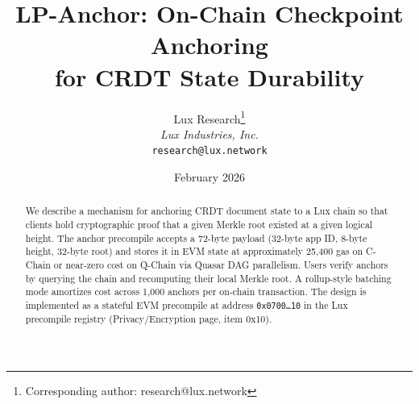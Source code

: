 \documentclass[11pt,a4paper]{article}
\title{LP-Anchor: On-Chain Checkpoint Anchoring\\for CRDT State Durability}
\author{
Lux Research\thanks{Corresponding author: research@lux.network}\\
\textit{Lux Industries, Inc.}\\
\texttt{research@lux.network}
}
\date{February 2026}
\begin{document}
\luxcoverpage

\begin{abstract}
We describe a mechanism for anchoring CRDT document state to a Lux chain
so that clients hold cryptographic proof that a given Merkle root existed at
a given logical height. The anchor precompile accepts a 72-byte payload
(32-byte app ID, 8-byte height, 32-byte root) and stores it in EVM state
at approximately 25,400 gas on C-Chain or near-zero cost on Q-Chain via
Quasar DAG parallelism. Users verify anchors by querying the chain and
recomputing their local Merkle root. A rollup-style batching mode amortizes
cost across 1,000 anchors per on-chain transaction. The design is
implemented as a stateful EVM precompile at address \texttt{0x0700\ldots10}
in the Lux precompile registry (Privacy/Encryption page, item 0x10).
\end{abstract}

\tableofcontents













\end{document}
